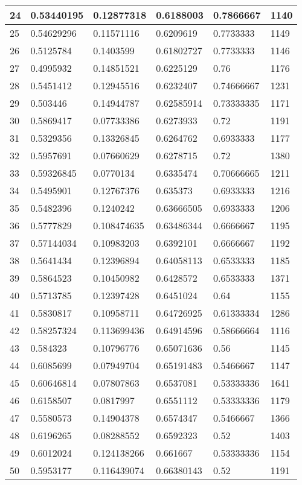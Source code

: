 \begin{longtable}{|l|l|l|l|l|l|}
24 & 0.53440195 & 0.12877318 & 0.6188003 & 0.7866667 & 1140 \\ \hline 
25 & 0.54629296 & 0.11571116 & 0.6209619 & 0.7733333 & 1149 \\ \hline 
26 & 0.5125784 & 0.1403599 & 0.61802727 & 0.7733333 & 1146 \\ \hline 
27 & 0.4995932 & 0.14851521 & 0.6225129 & 0.76 & 1176 \\ \hline 
28 & 0.5451412 & 0.12945516 & 0.6232407 & 0.74666667 & 1231 \\ \hline 
29 & 0.503446 & 0.14944787 & 0.62585914 & 0.73333335 & 1171 \\ \hline 
30 & 0.5869417 & 0.07733386 & 0.6273933 & 0.72 & 1191 \\ \hline 
31 & 0.5329356 & 0.13326845 & 0.6264762 & 0.6933333 & 1177 \\ \hline 
32 & 0.5957691 & 0.07660629 & 0.6278715 & 0.72 & 1380 \\ \hline 
33 & 0.59326845 & 0.0770134 & 0.6335474 & 0.70666665 & 1211 \\ \hline 
34 & 0.5495901 & 0.12767376 & 0.635373 & 0.6933333 & 1216 \\ \hline 
35 & 0.5482396 & 0.1240242 & 0.63666505 & 0.6933333 & 1206 \\ \hline 
36 & 0.5777829 & 0.108474635 & 0.63486344 & 0.6666667 & 1195 \\ \hline 
37 & 0.57144034 & 0.10983203 & 0.6392101 & 0.6666667 & 1192 \\ \hline 
38 & 0.5641434 & 0.12396894 & 0.64058113 & 0.6533333 & 1185 \\ \hline 
39 & 0.5864523 & 0.10450982 & 0.6428572 & 0.6533333 & 1371 \\ \hline 
40 & 0.5713785 & 0.12397428 & 0.6451024 & 0.64 & 1155 \\ \hline 
41 & 0.5830817 & 0.10958711 & 0.64726925 & 0.61333334 & 1286 \\ \hline 
42 & 0.58257324 & 0.113699436 & 0.64914596 & 0.58666664 & 1116 \\ \hline 
43 & 0.584323 & 0.10796776 & 0.65071636 & 0.56 & 1145 \\ \hline 
44 & 0.6085699 & 0.07949704 & 0.65191483 & 0.5466667 & 1147 \\ \hline 
45 & 0.60646814 & 0.07807863 & 0.6537081 & 0.53333336 & 1641 \\ \hline 
46 & 0.6158507 & 0.0817997 & 0.6551112 & 0.53333336 & 1179 \\ \hline 
47 & 0.5580573 & 0.14904378 & 0.6574347 & 0.5466667 & 1366 \\ \hline 
48 & 0.6196265 & 0.08288552 & 0.6592323 & 0.52 & 1403 \\ \hline 
49 & 0.6012024 & 0.124138266 & 0.661667 & 0.53333336 & 1154 \\ \hline 
50 & 0.5953177 & 0.116439074 & 0.66380143 & 0.52 & 1191 \\ \hline 
\end{longtable}